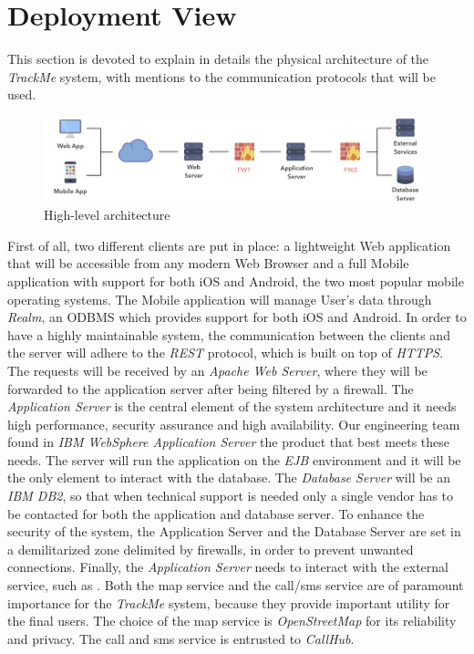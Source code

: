 \section{Deployment View}

This section is devoted to explain in details the physical architecture of the \textit{TrackMe} system, with mentions to the communication protocols that will be used.

\begin{figure}[H]

\includegraphics[scale=0.32,keepaspectratio]{./Pictures/high-level-firewall.png}
\centering
\caption{High-level architecture}

\end{figure}

First of all, two different clients are put in place: a lightweight Web application that will be accessible from any modern Web Browser and a full Mobile application with support for both iOS and Android, the two most popular mobile operating systems. The Mobile application will manage User's data through \textit{Realm}, an ODBMS which provides support for both iOS and Android. In order to have a highly maintainable system, the communication between the clients and the server will adhere to the \textit{REST} protocol, which is built on top of \textit{HTTPS}. 
The requests will be received by an \textit{Apache Web Server}, where they will be forwarded to the application server after being filtered by a firewall.
The \textit{Application Server} is the central element of the system architecture and it needs high performance, security assurance and high availability. Our engineering team found in \textit{IBM WebSphere Application Server} the product that best meets these needs. The server will run the application on the \textit{EJB} environment and it will be the only element to interact with the database. The \textit{Database Server} will be an \textit{IBM DB2}, so that when technical support is needed only a single vendor has to be contacted for both the application and database server. To enhance the security of the system, the Application Server and the Database Server are set in a demilitarized zone delimited by firewalls, in order to prevent unwanted connections.
Finally, the \textit{Application Server} needs to interact with the external service, such as . Both the map service and the call/sms service are of paramount importance for the \textit{TrackMe} system, because they provide important utility for the final users. The choice of the map service is \textit{OpenStreetMap} for its reliability and privacy. The call and sms service is entrusted to \textit{CallHub}.


